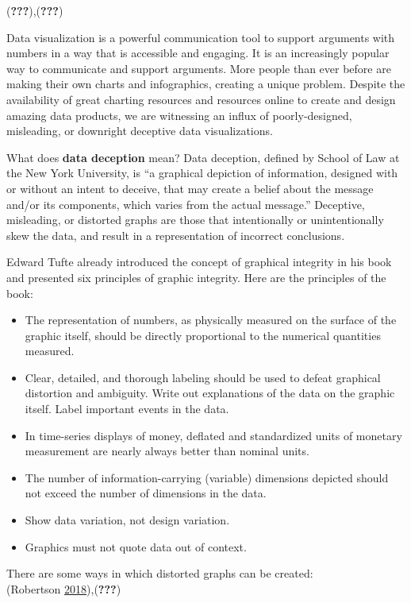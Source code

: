 \documentclass[]{book}
\providecommand{\tightlist}{%
  \setlength{\itemsep}{0pt}\setlength{\parskip}{0pt}}
\begin{document}
({\textbf{???}}),({\textbf{???}})

Data visualization is a powerful communication tool to support arguments with numbers in a way that is accessible and engaging. It is an increasingly popular way to communicate and support arguments. More people than ever before are making their own charts and infographics, creating a unique problem. Despite the availability of great charting resources and resources online to create and design amazing data products, we are witnessing an influx of poorly-designed, misleading, or downright deceptive data visualizations.

What does \textbf{data deception} mean? Data deception, defined by School of Law at the New York University, is ``a graphical depiction of information, designed with or without an intent to deceive, that may create a belief about the message and/or its components, which varies from the actual message.'' Deceptive, misleading, or distorted graphs are those that intentionally or unintentionally skew the data, and result in a representation of incorrect conclusions.

Edward Tufte already introduced the concept of graphical integrity in his book and presented six principles of graphic integrity. Here are the principles of the book:

\begin{itemize}
\tightlist
\item
  The representation of numbers, as physically measured on the surface of the graphic itself, should be directly proportional to the numerical quantities measured.
\item
  Clear, detailed, and thorough labeling should be used to defeat graphical distortion and ambiguity. Write out explanations of the data on the graphic itself. Label important events in the data.
\item
  In time-series displays of money, deﬂated and standardized units of monetary measurement are nearly always better than nominal units.
\item
  The number of information-carrying (variable) dimensions depicted should not exceed the number of dimensions in the data.
\item
  Show data variation, not design variation.
\item
  Graphics must not quote data out of context.
\end{itemize}

There are some ways in which distorted graphs can be created:\\
(Robertson \protect\hyperlink{ref-evil_axes}{2018}),({\textbf{???}})
\end{document}
